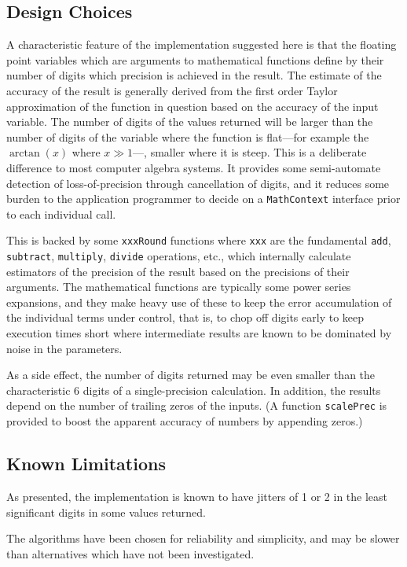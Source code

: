 \documentclass[showpacs,showkeys,amssymb,aps,twocolumn]{revtex4-1}
\begin{document}
\subsection{Design Choices}

A characteristic feature of the implementation suggested here is that
the floating point variables which are arguments to mathematical functions
define by their number of digits
which precision is
achieved in the result. The estimate of the accuracy of the result
is generally derived from the first order Taylor approximation of the function in question
based on the accuracy of the input variable. The number of digits of the
values returned will be larger than the number of digits of the variable where
the function is flat---for example the $\arctan(x)$ where $x\gg 1$---, smaller where it is steep.
This is a deliberate
difference to most computer algebra systems. It provides some semi-automate
detection of loss-of-precision through cancellation of digits, and it 
reduces some burden to the application programmer to decide on a
\texttt{MathContext} interface prior to each individual call.

This is backed by some \texttt{xxxRound} functions where \texttt{xxx}
are the fundamental \texttt{add}, \texttt{subtract}, \texttt{multiply},
\texttt{divide} operations, etc.,
which internally calculate estimators of the precision of the result based on
the precisions of their arguments. The mathematical functions are typically
some power series expansions, and they make heavy use of these to keep
the error accumulation of the individual terms under control, that is, to
chop off digits early to keep execution times short where intermediate results
are known to be dominated by noise in the parameters.

As a side effect, the number of digits returned may be even smaller
than the characteristic 6 digits of a single-precision calculation.
In addition, the results depend on the number of trailing zeros of the inputs.
(A function \texttt{scalePrec} is provided to boost the apparent accuracy
of numbers by appending zeros.)

\subsection{Known Limitations}
As presented, the implementation is known to have jitters of 1 or 2 
in the least significant digits in some values returned.

The algorithms have been chosen for reliability and simplicity,
and may be
slower than alternatives which have not been investigated.
\end{document}
